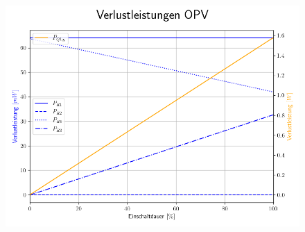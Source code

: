 \documentclass{beamer}
\begin{document}
	\begin{frame}
		\begin{center}
			\begin{figure}[tbh]
				\centering
				\includegraphics[width=0.95\linewidth]{medien/4.png}
			\end{figure}
		\end{center}
	\end{frame}
\end{document}
